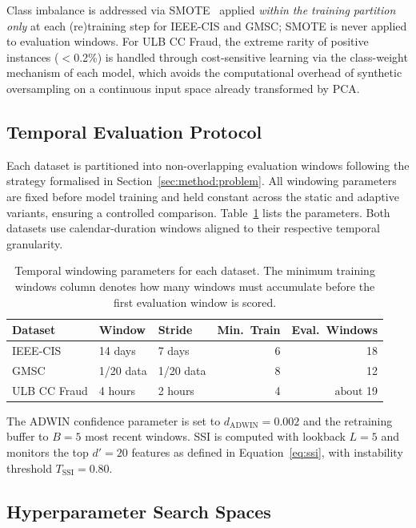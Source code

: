 \documentclass[pdflatex,sn-mathphys-num]{sn-jnl}
\theoremstyle{thmstyleone}
\theoremstyle{thmstyletwo}
\theoremstyle{thmstylethree}
\begin{document}
Class imbalance is addressed via SMOTE~\cite{chawla2002smote} applied
\emph{within the training partition only} at each (re)training step for
IEEE-CIS and GMSC; SMOTE is never applied to evaluation windows.
For ULB CC Fraud, the extreme rarity of positive instances ($<$0.2\%) is
handled through cost-sensitive learning via the class-weight mechanism of
each model, which avoids the computational overhead of synthetic oversampling
on a continuous input space already transformed by PCA.

\subsection{Temporal Evaluation Protocol}\label{sec:exp:temporal}

Each dataset is partitioned into non-overlapping evaluation windows following
the strategy formalised in Section~\ref{sec:method:problem}. All windowing
parameters are fixed before model training and held constant across the static
and adaptive variants, ensuring a controlled comparison.
Table~\ref{tab:windows} lists the parameters. Both datasets use
calendar-duration windows aligned to their respective temporal granularity.

\begin{table}[t]
  \caption{Temporal windowing parameters for each dataset. The minimum
           training windows column denotes how many windows must accumulate
           before the first evaluation window is scored.}
  \label{tab:windows}
  \centering
  \begin{tabular}{lllrr}
    \toprule
    Dataset & Window & Stride & Min.\ Train & Eval.\ Windows \\
    \midrule
    IEEE-CIS     & 14 days      & 7 days       & 6  & 18 \\
    GMSC         & 1/20 data    & 1/20 data    & 8  & 12 \\
    ULB CC Fraud & 4 hours      & 2 hours      & 4  & $\text{about }$19 \\
    \bottomrule
  \end{tabular}
\end{table}

The ADWIN confidence parameter is set to $d_{\mathrm{ADWIN}} = 0.002$ and the retraining
buffer to $B = 5$ most recent windows. SSI is computed with lookback $L = 5$
and monitors the top $d' = 20$ features as defined in
Equation~\eqref{eq:ssi}, with instability threshold
$T_{\mathrm{SSI}} = 0.80$.

\subsection{Hyperparameter Search Spaces}\label{sec:exp:hparams}
\end{document}
